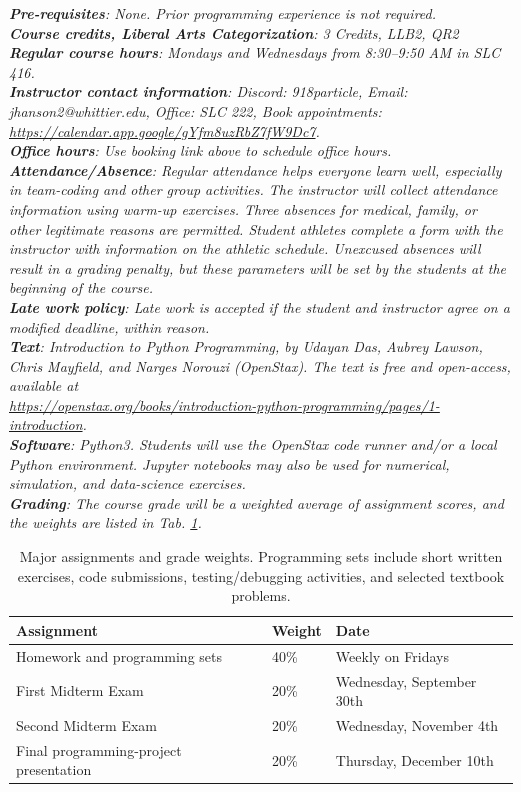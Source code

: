 \documentclass[10pt]{article}
\begin{document}
\noindent
\textit{\textbf{Pre-requisites}: None. Prior programming experience is not required.} \\
\textit{\textbf{Course credits, Liberal Arts Categorization}: 3 Credits, LLB2, QR2} \\
\textit{\textbf{Regular course hours}: Mondays and Wednesdays from 8:30--9:50 AM in SLC 416.} \\
\textit{\textbf{Instructor contact information}: Discord: 918particle, Email: jhanson2@whittier.edu, Office: SLC 222, Book appointments: \url{https://calendar.app.google/gYfm8uzRbZ7fW9Dc7}.} \\
\noindent
\textit{\textbf{Office hours}: Use booking link above to schedule office hours.} \\
\textit{\textbf{Attendance/Absence}: Regular attendance helps everyone learn well, especially in team-coding and other group activities.  The instructor will collect attendance information using warm-up exercises.  Three absences for medical, family, or other legitimate reasons are permitted.  Student athletes complete a form with the instructor with information on the athletic schedule.  Unexcused absences will result in a grading penalty, but these parameters will be set by the students at the beginning of the course.} \\
\textit{\textbf{Late work policy}: Late work is accepted if the student and instructor agree on a modified deadline, within reason.} \\
\textit{\textbf{Text}: \textit{Introduction to Python Programming}, by Udayan Das, Aubrey Lawson, Chris Mayfield, and Narges Norouzi (OpenStax). The text is free and open-access, available at \\ \url{https://openstax.org/books/introduction-python-programming/pages/1-introduction}.} \\
\textit{\textbf{Software}: Python3. Students will use the OpenStax code runner and/or a local Python environment. Jupyter notebooks may also be used for numerical, simulation, and data-science exercises.} \\
\textit{\textbf{Grading}: The course grade will be a weighted average of assignment scores, and the weights are listed in Tab. \ref{tab:grading}.}
\begin{table}[hb]
\centering
\begin{tabular}{| l | l | l |}
\hline
\textbf{Assignment} & \textbf{Weight} & \textbf{Date} \\ \hline
Homework and programming sets & 40\% & Weekly on Fridays \\ \hline
First Midterm Exam & 20\% & Wednesday, September 30th \\ \hline
Second Midterm Exam & 20\% & Wednesday, November 4th \\ \hline
Final programming-project presentation & 20\% & Thursday, December 10th \\ \hline
\end{tabular}
\caption{\label{tab:grading} Major assignments and grade weights. Programming sets include short written exercises, code submissions, testing/debugging activities, and selected textbook problems.}
\end{table}
\end{document}
